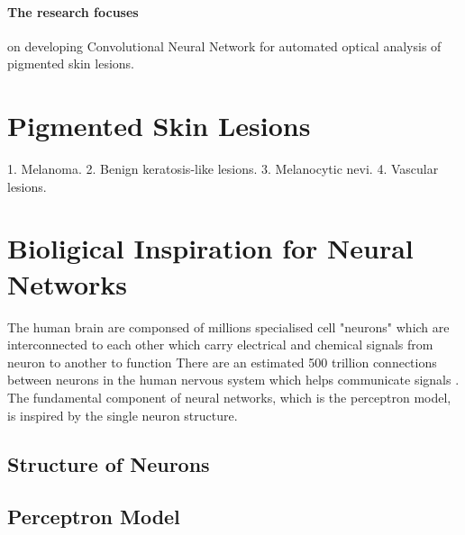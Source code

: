 \paragraph{ The research focuses}
 on developing  Convolutional Neural Network for automated optical analysis of pigmented skin lesions.
 
\section{Pigmented Skin Lesions}
1. Melanoma. 
2. Benign keratosis-like lesions.
3. Melanocytic nevi. 
4. Vascular lesions.
\pagebreak
\pagebreak
\section{Bioligical Inspiration for Neural Networks}
The human brain are componsed of millions specialised cell "neurons" which are interconnected to each other which carry electrical and chemical signals from neuron to another to function
There are an estimated 500 trillion connections between neurons in the human nervous system which helps communicate signals \citep*{patterson2017deep}.
The fundamental component of neural networks, which is the perceptron model, is inspired by the single neuron structure.
\subsection*{Structure of Neurons}

\subsection{Perceptron Model}
\pagebreak
